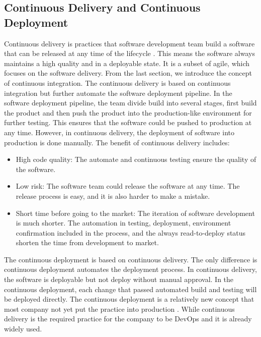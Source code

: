 \subsection{Continuous Delivery and Continuous Deployment}
\label{CD}
Continuous delivery is practices that software development team build a software that can be released at any time of the lifecycle \cite{fowler2013continuous}. This means the software always maintains a high quality and in a deployable state\cite{WhatisCo47:online}. It is a subset of agile, which focuses on the software delivery\cite{Continuo97:online}. From the last section, we introduce the concept of continuous integration. The continuous delivery is based on continuous integration but further automate the software deployment pipeline. In the software deployment pipeline, the team divide build into several stages, first build the product and then push the product into the production-like environment for further testing. This ensures that the software could be pushed to production at any time. However, in continuous delivery, the deployment of software into production is done manually.
The benefit \cite{WhatisCo47:online}\cite{fowler2013continuous} of continuous delivery includes:
\begin{itemize}
    \item High code quality: The automate and continuous testing ensure the quality of the software.
    \item Low risk: The software team could release the software at any time. The release process is easy, and it is also harder to make a mistake.
    \item Short time before going to the market: The iteration of software development is much shorter. The automation in testing, deployment, environment confirmation included in the process, and the always read-to-deploy status shorten the time from development to market.
\end{itemize}
The continuous deployment is based on continuous delivery. The only difference is continuous deployment automates the deployment process. In continuous delivery, the software is deployable but not deploy without manual approval. In the continuous deployment, each change that passed automated build and testing will be deployed directly. The continuous deployment is a relatively new concept that most company not yet put the practice into production \cite{leppanen2015highways}. While continuous delivery is the required practice for the company to be DevOps and it is already widely used.
